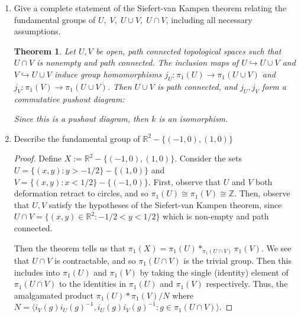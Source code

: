 \documentclass{article}
\newtheorem*{theorem}{Theorem}
\begin{document}
\begin{enumerate}
\begin{enumerate}
		\item Give a complete statement of the Siefert-van Kampen theorem relating the fundamental groups of $U,\; V,\;U \cup V,\; U \cap V$, including all necessary assumptions.
		
		\begin{theorem}
			Let $U,V$ be open, path connected topological spaces such that $U \cap V$ is nonempty and path connected. The inclusion maps of $U \hookrightarrow U \cup V$ and $V \hookrightarrow U \cup V$ induce group homomorphisms $j_U:\pi_1(U) \rightarrow \pi_1(U \cup V)$ and $j_V: \pi_1(V) \rightarrow \pi_1(U \cup V)$. Then $U \cup V$ is path connected, and $j_U, j_V$ form a commutative pushout diagram:
			
			\begin{center}\end{center}

Since this is a pushout diagram, then $k$ is an isomorphism.
		\end{theorem}
		
		\item Describe the fundamental group of $\mathbb{R}^2 - \{(-1,0), (1,0) \}$
		
		\begin{proof} Define $X:=\mathbb{R}^2 - \{(-1,0), (1,0) \}$.
		Consider the sets $U = \{ (x,y) : y > -1/2\} - \{(1,0)\}$ and $V = \{(x,y) : x < 1/2\}-\{(-1,0)\}$. First, observe that $U$ and $V$ both deformation retract to circles, and so $\pi_1(U) \cong \pi_1(V) \cong \mathbb{Z}$. Then, observe that $U,V$ satisfy the hypotheses of the Siefert-van Kampen theorem, since $U \cap V = \{(x,y) \in \mathbb{R}^2 : -1/2 < y < 1/2 \}$ which is non-empty and path connected.
		
		Then the theorem tells us that $\pi_1(X) = \pi_1(U) *_{\pi_1(U \cap V)} \pi_1(V)$. We see that $U \cap V$ is contractable, and so $\pi_1(U \cap V)$ is the trivial group. Then this includes into $\pi_1(U)$ and $\pi_1(V)$ by taking the single (identity) element of $\pi_1(U \cap V)$ to the identities in $\pi_1(U)$ and $\pi_1(V)$ respectively. Thus, the amalgamated product $\pi_1(U) * \pi_1(V) / N$ where $N = \langle i_V(g)i_U(g)^{-1}, i_U(g) i_V(g)^{-1} : g \in \pi_1(U \cap V)\rangle$.
		

\end{proof}
\end{enumerate}
\end{enumerate}
\end{document}
